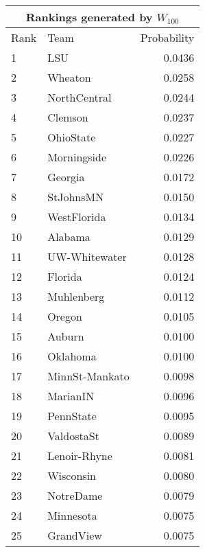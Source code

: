 \documentclass[11pt]{report}
\begin{document}
{\begin{tabular}{llr}
\toprule
  \multicolumn{3}{c}{Rankings generated by $W_{100}$} \\
\toprule
 Rank &           Team &  Probability \\
\midrule
    1 &            LSU &       0.0436 \\
    2 &        Wheaton &       0.0258 \\
    3 &   NorthCentral &       0.0244 \\
    4 &        Clemson &       0.0237 \\
    5 &      OhioState &       0.0227 \\
    6 &    Morningside &       0.0226 \\
    7 &        Georgia &       0.0172 \\
    8 &      StJohnsMN &       0.0150 \\
    9 &    WestFlorida &       0.0134 \\
   10 &        Alabama &       0.0129 \\
   11 &  UW-Whitewater &       0.0128 \\
   12 &        Florida &       0.0124 \\
   13 &     Muhlenberg &       0.0112 \\
   14 &         Oregon &       0.0105 \\
   15 &         Auburn &       0.0100 \\
   16 &       Oklahoma &       0.0100 \\
   17 & MinnSt-Mankato &       0.0098 \\
   18 &       MarianIN &       0.0096 \\
   19 &      PennState &       0.0095 \\
   20 &     ValdostaSt &       0.0089 \\
   21 &   Lenoir-Rhyne &       0.0081 \\
   22 &      Wisconsin &       0.0080 \\
   23 &      NotreDame &       0.0079 \\
   24 &      Minnesota &       0.0075 \\
   25 &      GrandView &       0.0075 \\
\bottomrule
\end{tabular}
}

\pagebreak
\end{document}
